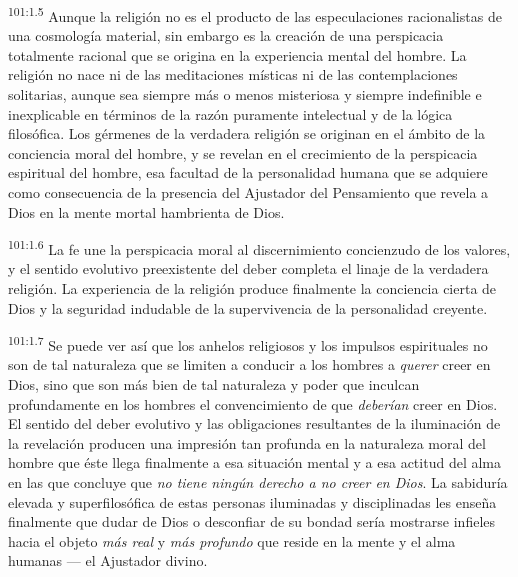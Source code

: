 \par
\textsuperscript{101:1.5} Aunque la religión no es el producto de las especulaciones racionalistas de una cosmología material, sin embargo es la creación de una perspicacia totalmente racional que se origina en la experiencia mental del hombre. La religión no nace ni de las meditaciones místicas ni de las contemplaciones solitarias, aunque sea siempre más o menos misteriosa y siempre indefinible e inexplicable en términos de la razón puramente intelectual y de la lógica filosófica. Los gérmenes de la verdadera religión se originan en el ámbito de la conciencia moral del hombre, y se revelan en el crecimiento de la perspicacia espiritual del hombre, esa facultad de la personalidad humana que se adquiere como consecuencia de la presencia del Ajustador del Pensamiento que revela a Dios en la mente mortal hambrienta de Dios.

\par
\textsuperscript{101:1.6} La fe une la perspicacia moral al discernimiento concienzudo de los valores, y el sentido evolutivo preexistente del deber completa el linaje de la verdadera religión. La experiencia de la religión produce finalmente la conciencia cierta de Dios y la seguridad indudable de la supervivencia de la personalidad creyente.

\par
\textsuperscript{101:1.7} Se puede ver así que los anhelos religiosos y los impulsos espirituales no son de tal naturaleza que se limiten a conducir a los hombres a \textit{querer} creer en Dios, sino que son más bien de tal naturaleza y poder que inculcan profundamente en los hombres el convencimiento de que \textit{deberían} creer en Dios. El sentido del deber evolutivo y las obligaciones resultantes de la iluminación de la revelación producen una impresión tan profunda en la naturaleza moral del hombre que éste llega finalmente a esa situación mental y a esa actitud del alma en las que concluye que \textit{no tiene ningún derecho a no creer en Dios}. La sabiduría elevada y superfilosófica de estas personas iluminadas y disciplinadas les enseña finalmente que dudar de Dios o desconfiar de su bondad sería mostrarse infieles hacia el objeto \textit{más real} y \textit{más profundo} que reside en la mente y el alma humanas --- el Ajustador divino.


